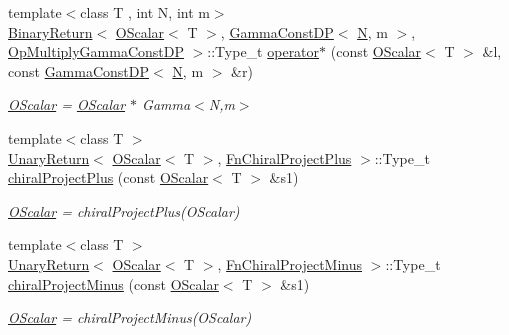 \begin{DoxyCompactItemize}
{\footnotesize template$<$class T , int N, int m$>$ }\\\mbox{\hyperlink{structENSEM_1_1BinaryReturn}{Binary\+Return}}$<$ \mbox{\hyperlink{classENSEM_1_1OScalar}{O\+Scalar}}$<$ T $>$, \mbox{\hyperlink{classENSEM_1_1GammaConstDP}{Gamma\+Const\+DP}}$<$ \mbox{\hyperlink{operator__name__util_8cc_a7722c8ecbb62d99aee7ce68b1752f337}{N}}, m $>$, \mbox{\hyperlink{structENSEM_1_1OpMultiplyGammaConstDP}{Op\+Multiply\+Gamma\+Const\+DP}} $>$\+::Type\+\_\+t \mbox{\hyperlink{group__obsscalar_ga3a908302b6f4903874da2282ce03fdf7}{operator$\ast$}} (const \mbox{\hyperlink{classENSEM_1_1OScalar}{O\+Scalar}}$<$ T $>$ \&l, const \mbox{\hyperlink{classENSEM_1_1GammaConstDP}{Gamma\+Const\+DP}}$<$ \mbox{\hyperlink{operator__name__util_8cc_a7722c8ecbb62d99aee7ce68b1752f337}{N}}, m $>$ \&r)
\begin{DoxyCompactList}\small\item\em \mbox{\hyperlink{classENSEM_1_1OScalar}{O\+Scalar}} = \mbox{\hyperlink{classENSEM_1_1OScalar}{O\+Scalar}} $\ast$ Gamma$<$\+N,m$>$ \end{DoxyCompactList}\item 
{\footnotesize template$<$class T $>$ }\\\mbox{\hyperlink{structENSEM_1_1UnaryReturn}{Unary\+Return}}$<$ \mbox{\hyperlink{classENSEM_1_1OScalar}{O\+Scalar}}$<$ T $>$, \mbox{\hyperlink{structENSEM_1_1FnChiralProjectPlus}{Fn\+Chiral\+Project\+Plus}} $>$\+::Type\+\_\+t \mbox{\hyperlink{group__obsscalar_gad83dc4f2cde27e1d12f3eb6eb672bf87}{chiral\+Project\+Plus}} (const \mbox{\hyperlink{classENSEM_1_1OScalar}{O\+Scalar}}$<$ T $>$ \&s1)
\begin{DoxyCompactList}\small\item\em \mbox{\hyperlink{classENSEM_1_1OScalar}{O\+Scalar}} = chiral\+Project\+Plus(\+O\+Scalar) \end{DoxyCompactList}\item 
{\footnotesize template$<$class T $>$ }\\\mbox{\hyperlink{structENSEM_1_1UnaryReturn}{Unary\+Return}}$<$ \mbox{\hyperlink{classENSEM_1_1OScalar}{O\+Scalar}}$<$ T $>$, \mbox{\hyperlink{structENSEM_1_1FnChiralProjectMinus}{Fn\+Chiral\+Project\+Minus}} $>$\+::Type\+\_\+t \mbox{\hyperlink{group__obsscalar_ga53162d32552af7a67c288bfa204dce7c}{chiral\+Project\+Minus}} (const \mbox{\hyperlink{classENSEM_1_1OScalar}{O\+Scalar}}$<$ T $>$ \&s1)
\begin{DoxyCompactList}\small\item\em \mbox{\hyperlink{classENSEM_1_1OScalar}{O\+Scalar}} = chiral\+Project\+Minus(\+O\+Scalar) \end{DoxyCompactList}\item 

\end{DoxyCompactItemize}
